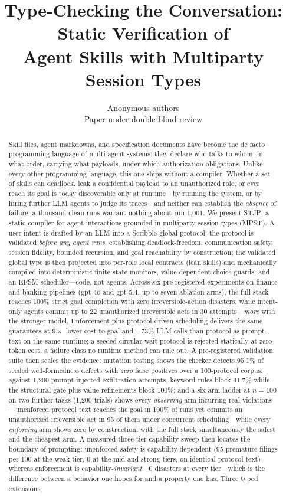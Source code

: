 \documentclass{article}
\title{\bf Type-Checking the Conversation: Static Verification of\\ Agent Skills with Multiparty Session Types}
\author{Anonymous authors\\ \small Paper under double-blind review}
\date{}
\newcommand{\stjp}{\textsc{STJP}}
\begin{document}
\maketitle

\begin{abstract}
Skill files, agent markdowns, and specification documents have become the de facto programming language of multi-agent systems: they declare who talks to whom, in what order, carrying what payloads, under which authorization obligations. Unlike every other programming language, this one ships without a compiler. Whether a set of skills can deadlock, leak a confidential payload to an unauthorized role, or ever reach its goal is today discoverable only at runtime---by running the system, or by hiring further LLM agents to judge its traces---and neither can establish the \emph{absence} of failure: a thousand clean runs warrant nothing about run 1{,}001. We present \stjp{}, a static compiler for agent interactions grounded in multiparty session types (MPST). A user intent is drafted by an LLM into a Scribble global protocol; the protocol is validated \emph{before any agent runs}, establishing deadlock-freedom, communication safety, session fidelity, bounded recursion, and goal reachability by construction; the validated global type is then projected into per-role local contracts (lean skills) and mechanically compiled into deterministic finite-state monitors, value-dependent choice guards, and an EFSM scheduler---code, not agents. Across six pre-registered experiments on finance and banking pipelines (gpt-4o and gpt-5.4, up to seven ablation arms), the full stack reaches 100\% strict goal completion with zero irreversible-action disasters, while intent-only agents commit up to 22 unauthorized irreversible acts in 30 attempts---\emph{more} with the stronger model. Enforcement plus protocol-driven scheduling delivers the same guarantees at $9\times$ lower cost-to-goal and $-73\%$ LLM calls than protocol-as-prompt-text on the same runtime; a seeded circular-wait protocol is rejected statically at zero token cost, a failure class no runtime method can rule out. A pre-registered validation suite then scales the evidence: mutation testing shows the checker detects 95.1\% of seeded well-formedness defects with \emph{zero} false positives over a 100-protocol corpus; against 1{,}200 prompt-injected exfiltration attempts, keyword rules block 41.7\% while the structural gate plus value refinements block 100\%; and a six-arm ladder at $n{=}100$ on two further tasks (1{,}200 trials) shows every \emph{observing} arm incurring real violations---unenforced protocol text reaches the goal in 100\% of runs yet commits an unauthorized irreversible act in 95 of them under concurrent scheduling---while every \emph{enforcing} arm shows zero by construction, with the full stack simultaneously the safest and the cheapest arm. A measured three-tier capability sweep then locates the boundary of prompting: unenforced safety is capability-dependent (95 premature filings per 100 at the weak tier, 0 at the mid and strong tiers, on identical protocol text) whereas enforcement is capability-\emph{invariant}---0 disasters at every tier---which is the difference between a behavior one hopes for and a property one has. Three typed extensions, 
\end{abstract}
\end{document}
